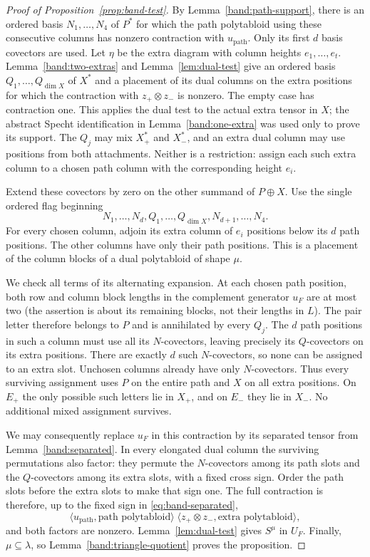 \begin{proof}[Proof of Proposition~\ref{prop:band-test}]
By Lemma~\ref{band:path-support}, there is an ordered basis
$N_1,\ldots,N_4$ of $P^*$ for which the path polytabloid using
these consecutive columns has nonzero contraction with
$u_{\mathrm{path}}$.  Only its first $d$ basis covectors are used.
Let $\eta$ be the extra diagram with column heights
$e_1,\ldots,e_t$.  Lemma~\ref{band:two-extras} and
Lemma~\ref{lem:dual-test} give an ordered basis
$Q_1,\ldots,Q_{\dim X}$ of $X^*$ and a placement of its dual
columns on the extra positions for which the contraction with
$z_+\otimes z_-$ is nonzero.  The empty case has contraction one.
This applies the dual test to the actual extra tensor in $X$;
the abstract Specht identification in
Lemma~\ref{band:one-extra} was used only to prove its support.
The $Q_j$ may mix $X_+^*$ and $X_-^*$, and an extra dual column
may use positions from both attachments.  Neither is a
restriction: assign each such extra column to a chosen path
column with the corresponding height $e_i$.

Extend these covectors by zero on the other summand of $P\oplus X$.
Use the single ordered flag beginning
\[
 N_1,\ldots,N_d,Q_1,\ldots,Q_{\dim X},
       N_{d+1},\ldots,N_4.
\]
For every chosen column, adjoin its extra column of $e_i$ positions
below its $d$ path positions.  The other columns have only their
path positions.  This is a placement of the column blocks of a
dual polytabloid of shape $\mu$.

We check all terms of its alternating expansion.  At each chosen
path position, both row and column block lengths in the
complement generator $u_F$ are at most two (the assertion is
about its remaining blocks, not their lengths in $L$).
The pair letter therefore belongs to $P$ and is annihilated by
every $Q_j$.  The $d$ path positions in such a column must use
all its $N$-covectors, leaving precisely its $Q$-covectors on its
extra positions.  There are exactly $d$ such $N$-covectors, so
none can be assigned to an extra slot.  Unchosen columns already have only
$N$-covectors.  Thus every surviving assignment uses $P$ on the
entire path and $X$ on all extra positions.  On $E_+$ the only
possible such letters lie in $X_+$, and on $E_-$ they lie in
$X_-$.  No additional mixed assignment survives.

We may consequently replace $u_F$ in this contraction by its
separated tensor from Lemma~\ref{band:separated}.  In every
elongated dual column the surviving permutations also factor:
they permute the $N$-covectors among its path slots and the
$Q$-covectors among its extra slots, with a fixed cross sign.
Order the path slots before the extra slots to make that sign
one.  The full contraction is therefore, up to the fixed sign
in \eqref{eq:band-separated},
\[
 \langle u_{\mathrm{path}},\text{path polytabloid}\rangle
 \;\langle z_+\otimes z_-,\text{extra polytabloid}\rangle,
\]
and both factors are nonzero.  Lemma~\ref{lem:dual-test} gives
$S^\mu$ in $U_F$.  Finally, $\mu\subseteq\lambda$, so
Lemma~\ref{band:triangle-quotient} proves the proposition.
\end{proof}
